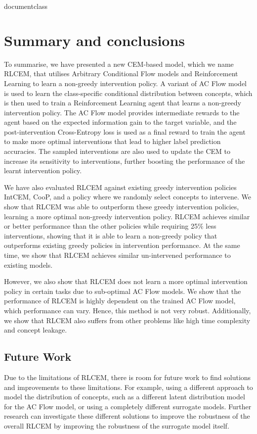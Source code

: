 \csname documentclass

\chapter{Summary and conclusions}

To summarise, we have presented a new CEM-based model,
which we name RLCEM, that utilises Arbitrary Conditional Flow 
models and Reinforcement Learning to learn a non-greedy 
intervention policy. A variant of AC Flow model is used to 
learn the class-specific
conditional distribution between concepts, which is then used 
to train a Reinforcement Learning agent that learns
a non-greedy intervention policy. The AC Flow model 
provides intermediate rewards to the agent based on the
expected information gain to the target variable,
and the post-intervention Cross-Entropy loss is used as a final reward
to train the agent to make more optimal 
interventions that lead to 
higher label prediction accuracies. The sampled interventions
are also used to update the CEM to increase its sensitivity
to interventions, further boosting the performance of the learnt
intervention policy.

We have also evaluated RLCEM against existing greedy intervention
policies IntCEM, CooP, and a policy where we randomly select
concepts to intervene. We show that RLCEM was able to outperform 
these greedy intervention policies, learning a more optimal
non-greedy intervention policy. RLCEM achieves similar or 
better performance than the other policies while requiring
25\% less interventions, 
showing that it is able to learn a non-greedy policy that 
outperforms existing greedy policies in intervention
performance. At the same time,
we show that RLCEM achieves similar un-intervened performance
to existing models.

However, we also show that RLCEM
does not learn a more optimal intervention policy
in certain tasks due to sub-optimal AC Flow models.
We show that the performance of RLCEM is highly dependent on
the trained AC Flow model, which performance can vary. 
Hence, this method
is not very robust. Additionally, we show that 
RLCEM also suffers from other problems like 
high time complexity and concept leakage.

\section{Future Work}
Due to the limitations of RLCEM, there is room for future 
work to find solutions and improvements to these limitations.
For example, using a different approach to model
the distribution of concepts, such as 
a different latent distribution model for the AC Flow model,
or using a completely different surrogate models. Further 
research can investigate these different solutions to 
improve the robustness of the overall RLCEM 
by improving the robustness of the surrogate model itself.

